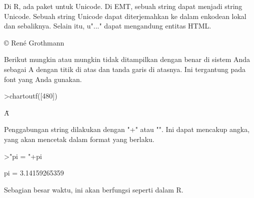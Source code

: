 \documentclass[a4paper,10pt]{article}
\begin{document}
\begin{eulernotebook}
\begin{eulercomment}
\begin{eulercomment}
\begin{eulercomment}
\begin{eulercomment}
\begin{eulercomment}
Di R, ada paket untuk Unicode. Di EMT, sebuah string dapat menjadi
string Unicode. Sebuah string Unicode dapat diterjemahkan ke dalam
enkodean lokal dan sebaliknya. Selain itu, u"..." dapat mengandung
entitas HTML.
\end{eulercomment}
\begin{euleroutput}
  © René Grothmann
\end{euleroutput}
\begin{eulercomment}
Berikut mungkin atau mungkin tidak ditampilkan dengan benar di sistem
Anda sebagai A dengan titik di atas dan tanda garis di atasnya. Ini
tergantung pada font yang Anda gunakan.
\end{eulercomment}
\begin{eulerprompt}
>chartoutf([480])
\end{eulerprompt}
\begin{euleroutput}
  Ǡ
\end{euleroutput}
\begin{eulercomment}
Penggabungan string dilakukan dengan "+" atau "\textbar{}". Ini dapat mencakup
angka, yang akan mencetak dalam format yang berlaku.
\end{eulercomment}
\begin{eulerprompt}
>"pi = "+pi
\end{eulerprompt}
\begin{euleroutput}
  pi = 3.14159265359
\end{euleroutput}
\begin{eulercomment}
Sebagian besar waktu, ini akan berfungsi seperti dalam R.


\end{eulercomment}
\end{eulercomment}
\end{eulercomment}
\end{eulercomment}
\end{eulercomment}
\end{eulernotebook}
\end{document}
